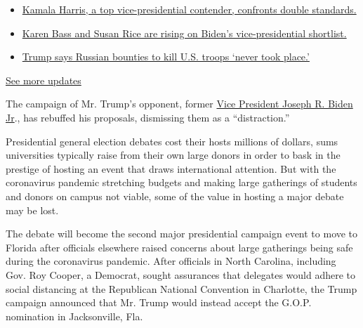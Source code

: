 \begin{itemize}
\tightlist
\item
  \href{https://www.nytimes.com/2020/07/31/us/elections/biden-vs-trump.html?action=click\&pgtype=Article\&state=default\&region=MAIN_CONTENT_1\&context=storylines_live_updates\#link-29fdff45}{Kamala
  Harris, a top vice-presidential contender, confronts double
  standards.}
\item
  \href{https://www.nytimes.com/2020/07/31/us/elections/biden-vs-trump.html?action=click\&pgtype=Article\&state=default\&region=MAIN_CONTENT_1\&context=storylines_live_updates\#link-13ec3d9c}{Karen
  Bass and Susan Rice are rising on Biden's vice-presidential
  shortlist.}
\item
  \href{https://www.nytimes.com/2020/07/31/us/elections/biden-vs-trump.html?action=click\&pgtype=Article\&state=default\&region=MAIN_CONTENT_1\&context=storylines_live_updates\#link-49e9a016}{Trump
  says Russian bounties to kill U.S. troops `never took place.'}
\end{itemize}

\href{https://www.nytimes.com/2020/07/31/us/elections/biden-vs-trump.html?action=click\&pgtype=Article\&state=default\&region=MAIN_CONTENT_1\&context=storylines_live_updates}{See
more updates}

The campaign of Mr. Trump's opponent, former
\href{https://www.nytimes.com/2020/06/30/us/politics/biden-transition-team.html}{Vice
President Joseph R. Biden Jr}., has rebuffed his proposals, dismissing
them as a ``distraction.''

Presidential general election debates cost their hosts millions of
dollars, sums universities typically raise from their own large donors
in order to bask in the prestige of hosting an event that draws
international attention. But with the coronavirus pandemic stretching
budgets and making large gatherings of students and donors on campus not
viable, some of the value in hosting a major debate may be lost.

The debate will become the second major presidential campaign event to
move to Florida after officials elsewhere raised concerns about large
gatherings being safe during the coronavirus pandemic. After officials
in North Carolina, including Gov. Roy Cooper, a Democrat, sought
assurances that delegates would adhere to social distancing at the
Republican National Convention in Charlotte, the Trump campaign
announced that Mr. Trump would instead accept the G.O.P. nomination in
Jacksonville, Fla.

